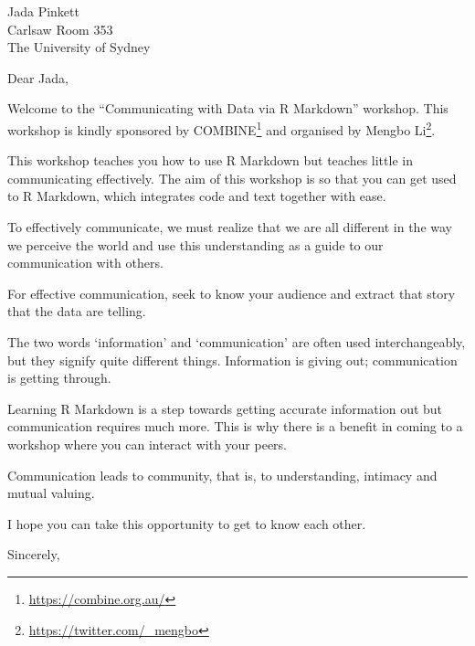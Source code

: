 \documentclass[11pt,]{letter}
\date{4th October 2019}
\renewcommand{\href}[2]{#2\footnote{\url{#1}}}
\renewenvironment{quote}{\begin{blockquote}\list{}{\rightmargin=0em\leftmargin=0em}%
\item\relax\color{greytext}\ignorespaces}{\unskip\unskip\endlist\end{blockquote}}
\begin{document}
\begin{letter}{Jada Pinkett\\
Carlsaw Room 353\\
The University of Sydney\\}
\opening{Dear Jada,}

Welcome to the ``Communicating with Data via R Markdown'' workshop. This
workshop is kindly sponsored by \href{https://combine.org.au/}{COMBINE}
and organised by \href{https://twitter.com/_mengbo}{Mengbo Li}.

This workshop teaches you how to use R Markdown but teaches little in
communicating effectively. The aim of this workshop is so that you can
get used to R Markdown, which integrates code and text together with
ease.

\begin{quote}
To effectively communicate, we must realize that we are all different in
the way we perceive the world and use this understanding as a guide to
our communication with others.
\end{quote}

For effective communication, seek to know your audience and extract that
story that the data are telling.

\begin{quote}
The two words `information' and `communication' are often used
interchangeably, but they signify quite different things. Information is
giving out; communication is getting through.
\end{quote}

Learning R Markdown is a step towards getting accurate information out
but communication requires much more. This is why there is a benefit in
coming to a workshop where you can interact with your peers.

\begin{quote}
Communication leads to community, that is, to understanding, intimacy
and mutual valuing.
\end{quote}

I hope you can take this opportunity to get to know each other.

\longindentation=0pt
\closing{Sincerely,}

\end{letter}
\end{document}

